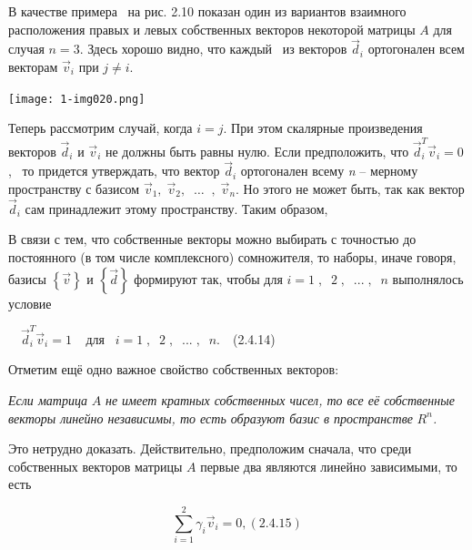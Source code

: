 		В качестве примера \ на рис. 2.10 показан один из вариантов взаимного расположения правых и левых собственных векторов
		некоторой матрицы  $A$ для случая  $n=3$. Здесь хорошо видно, что каждый \ из векторов  $\vec d_i$ ортогонален всем
		векторам  $\vec v_i$ при  $j\neq i$.


{\centering  \texttt{[image: 1-img020.png]} \par}

\bigskip


		Теперь рассмотрим случай, когда  $i=j$. При этом скалярные произведения векторов  $\vec d_i$ и  $\vec v_i$ не должны
		быть равны нулю. Если предположить, что  $\vec d_i^T\vec v_i=0$, \ то придется утверждать, что вектор  $\vec d_i$
		ортогонален всему \textit{n} – мерному пространству с базисом  $\vec v_1,\;\vec v_2,\;\;\ldots \;\;,\;\vec v_n$. Но
		этого не может быть, так как вектор  $\vec d_i$ сам принадлежит этому пространству. Таким образом,





		В связи с тем, что собственные векторы можно выбирать с точностью до постоянного (в том числе комплексного) сомножителя,
		то наборы, иначе говоря, базисы  $\left\{\vec v\right\}$ и  $\left\{\vec d\right\}$ формируют так, чтобы для 
		$i=1\;,\;\;2\;,\;\;...\;,\;\;n$ выполнялось условие



		\ \  $\vec d_i^T\vec v_i=1\;\;\;\;\text{для}\;\;\;i=1\;,\;\;2\;,\;\;...\;,\;\;n$.\ \ (2.4.14)



		Отметим ещё одно важное свойство собственных векторов:



		\textit{Если матрица } $A$\textit{ не имеет кратных собственных чисел, то все её собственные векторы линейно независимы,
			то есть образуют базис в пространстве } $R^n$\textit{.} 



		Это нетрудно доказать. Действительно, предположим сначала, что среди собственных векторов матрицы  $A$ первые два
		являются линейно зависимыми, то есть



\begin{equation}\label{eq:vectormatrixA}
	\overset 2{\underset{i=1}{\sum }}\gamma_i\vec v_i=0,  (2.4.15)
\end{equation}



